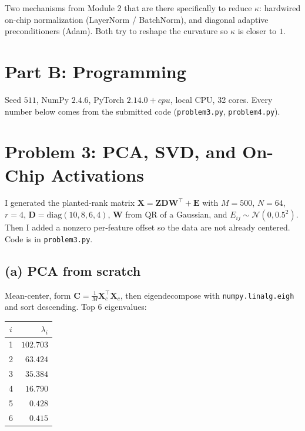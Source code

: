 \documentclass[11pt]{article}
\newcommand{\mat}[1]{\mathbf{#1}}
\begin{document}
Two mechanisms from Module 2 that are there specifically to reduce
\(\kappa\): hardwired on-chip normalization (LayerNorm / BatchNorm), and
diagonal adaptive preconditioners (Adam). Both try to reshape the curvature
so \(\kappa\) is closer to \(1\).

\newpage
\section*{Part B: Programming}

Seed \(511\), NumPy \(2.4.6\), PyTorch \(2.14.0+cpu\), local CPU, 32 cores.
Every number below comes from the submitted code
(\texttt{problem3.py}, \texttt{problem4.py}).

\section{Problem 3: PCA, SVD, and On-Chip Activations}

I generated the planted-rank matrix
\(\mat{X}=\mat{Z}\mat{D}\mat{W}^\top+\mat{E}\) with
\(M=500\), \(N=64\), \(r=4\), \(\mat{D}=\mathrm{diag}(10,8,6,4)\),
\(\mat{W}\) from QR of a Gaussian, and \(E_{ij}\sim\mathcal{N}(0,0.5^2)\).
Then I added a nonzero per-feature offset so the data are not already
centered. Code is in \texttt{problem3.py}.

\subsection*{(a) PCA from scratch}

Mean-center, form \(\mat{C}=\frac1M \mat{X}_c^\top\mat{X}_c\), then
eigendecompose with \texttt{numpy.linalg.eigh} and sort descending. Top 6
eigenvalues:

\begin{center}
\begin{tabular}{cr}
    \toprule
    \(i\) & \(\lambda_i\) \\
    \midrule
    1 & \(102.703\) \\
    2 & \(63.424\) \\
    3 & \(35.384\) \\
    4 & \(16.790\) \\
    5 & \(0.428\) \\
    6 & \(0.415\) \\
    \bottomrule
\end{tabular}
\end{center}
\end{document}
